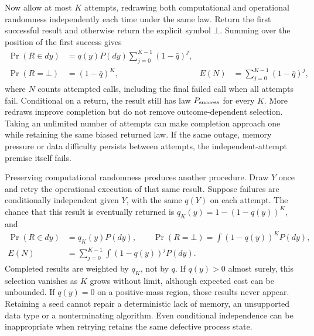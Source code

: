 Now allow at most $K$ attempts, redrawing both computational and operational
randomness independently each time under the same law. Return the first
successful result and otherwise return the explicit symbol $\bot$. Summing
over the position of the first success gives
\begin{align}
 \Pr(R\in dy)&=q(y)P(dy)\sum_{j=0}^{K-1}(1-\bar q)^j,
 \nonumber\\
 \Pr(R=\bot)&=(1-\bar q)^K,
 &E(N)&=\sum_{j=0}^{K-1}(1-\bar q)^j,
 \label{exec17:s9-redraw-law}
\end{align}
where $N$ counts attempted calls, including the final failed call when all
attempts fail. Conditional on a return, the result still has law
$P_{\rm success}$ for every $K$. More redraws improve completion but do not
remove outcome-dependent selection. Taking an unlimited number of attempts
can make completion approach one while retaining the same biased returned
law. If the same outage, memory pressure or data difficulty persists between
attempts, the independent-attempt premise itself fails.

Preserving computational randomness produces another procedure. Draw $Y$ once
and retry the operational execution of that same result. Suppose failures are
conditionally independent given $Y$, with the same $q(Y)$ on each attempt.
The chance that this result is eventually returned is
$q_K(y)=1-(1-q(y))^K$, and
\begin{align}
 \Pr(R\in dy)&=q_K(y)P(dy),\qquad
 \Pr(R=\bot)=\int(1-q(y))^K P(dy),
 \nonumber\\
 E(N)&=\sum_{j=0}^{K-1}\int(1-q(y))^jP(dy).
 \label{exec17:s9-frozen-law}
\end{align}
Completed results are weighted by $q_K$, not by $q$. If $q(y)>0$ almost
surely, this selection vanishes as $K$ grows without limit, although expected
cost can be unbounded. If $q(y)=0$ on a positive-mass region, those results
never appear. Retaining a seed cannot repair a deterministic lack of memory,
an unsupported data type or a nonterminating algorithm. Even conditional
independence can be inappropriate when retrying retains the same defective
process state.

